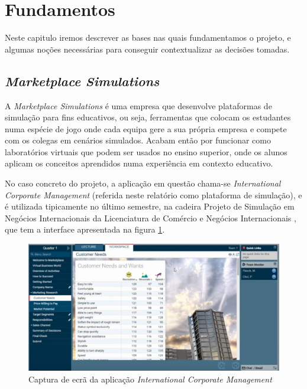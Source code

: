 \section{Fundamentos}
\label{sec:fundamentos}

Neste capitulo iremos descrever as bases nas quais fundamentamos o projeto, e algumas noções necessárias para conseguir contextualizar as decisões tomadas.

\subsection{\textit{Marketplace Simulations}}
\label{sec:marketplace}

A \textit{Marketplace Simulations} \cite{MarketplaceSim_2025} é uma empresa que desenvolve plataformas de simulação para fins educativos, ou seja, ferramentas que colocam os estudantes numa espécie de jogo onde cada equipa gere a sua própria empresa e compete com os colegas em cenários simulados. Acabam então por funcionar como laboratórios virtuais que podem ser usados no ensino superior, onde os alunos aplicam os conceitos aprendidos numa experiência em contexto educativo.

No caso concreto do projeto, a aplicação em questão chama-se \textit{International Corporate Management} (referida neste relatório como plataforma de simulação), e é utilizada tipicamente no último semestre, na cadeira Projeto de Simulação em Negócios Internacionais da Licenciatura de Comércio e Negócios Internacionais \cite{FUC_ISCAL_2025}, que tem a interface apresentada na figura \ref{fig:marketplace1}.

\begin{figure}[h]
    \centering
    \includegraphics[max width=\textwidth]{./img/marketplace1}
 \caption{Captura de ecrã da aplicação \textit{International Corporate Management}}
 \label{fig:marketplace1}
 \end{figure}

